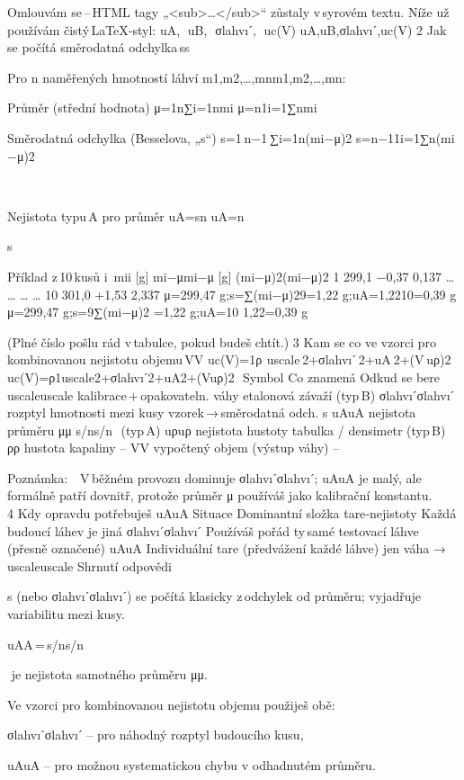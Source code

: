 Omlouvám se – HTML tagy „<sub>…</sub>“ zůstaly v syrovém textu. Níže už používám čistý LaTeX‑styl:
uA,    uB,    σlahvıˊ,    uc(V)
uA​,uB​,σlahvıˊ​,uc​(V)
2  Jak se počítá směrodatná odchylka ss

Pro n naměřených hmotností láhví m1,m2,…,mnm1​,m2​,…,mn​:

    Průměr (střední hodnota)
    μ=1n∑i=1nmi
    μ=n1​i=1∑n​mi​

    Směrodatná odchylka (Besselova, „s“)
    s=1 n−1 ∑i=1n(mi−μ)2
    s=n−11​i=1∑n​(mi​−μ)2

​

Nejistota typu A pro průměr
uA=sn
uA​=n

    ​s​

Příklad z 10 kusů
i	 mii​ [g]	mi−μmi​−μ [g]	(mi−μ)2(mi​−μ)2
1	299,1	−0,37	0,137 
…	…	…	…
10	301,0	+1,53	2,337
μ=299,47 g;s=∑(mi−μ)29=1,22 g;uA=1,2210=0,39 g
μ=299,47 g;s=9∑(mi​−μ)2​
​=1,22 g;uA​=10
​1,22​=0,39 g

(Plné číslo pošlu rád v tabulce, pokud budeš chtít.)
3  Kam se co ve vzorci pro kombinovanou nejistotu objemu VV
uc(V)=1ρ  uscale 2+σlahvıˊ 2+uA 2+(V uρ)2
uc​(V)=ρ1​uscale2​+σlahvıˊ2​+uA2​+(Vuρ​)2
​​
Symbol	Co znamená	Odkud se bere
uscaleuscale​	kalibrace + opakovateln. váhy	etalonová závaží (typ B)
σlahvıˊσlahvıˊ​	rozptyl hmotnosti mezi kusy	vzorek → směrodatná odch. s
uAuA​	nejistota průměru μμ	s/ns/n
​ (typ A)
uρuρ​	nejistota hustoty	tabulka / densimetr (typ B)
ρρ	hustota kapaliny	–
VV	vypočtený objem (výstup váhy)	–

Poznámka: V běžném provozu dominuje σlahvıˊσlahvıˊ​; uAuA​ je malý, ale formálně patří dovnitř, protože průměr μ používáš jako kalibrační konstantu.
4  Kdy opravdu potřebuješ uAuA​
Situace	Dominantní složka tare‑nejistoty
Každá budoucí láhev je jiná	σlahvıˊσlahvıˊ​
Používáš pořád ty samé testovací láhve (přesně označené)	uAuA​
Individuální tare (předvážení každé láhve)	jen váha → uscaleuscale​
Shrnutí odpovědi

    s (nebo σlahvıˊσlahvıˊ​) se počítá klasicky z odchylek od průměru; vyjadřuje variabilitu mezi kusy.

    uAA​ = s/ns/n

    ​ je nejistota samotného průměru μμ.

    Ve vzorci pro kombinovanou nejistotu objemu použiješ obě:

        σlahvıˊσlahvıˊ​ – pro náhodný rozptyl budoucího kusu,

        uAuA​ – pro možnou systematickou chybu v odhadnutém průměru.


